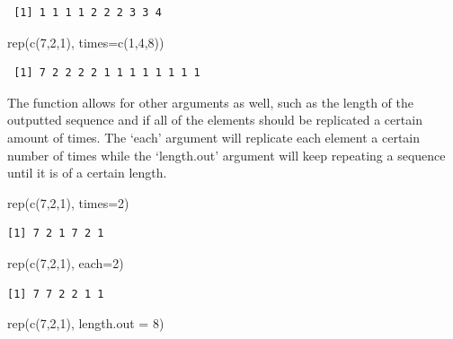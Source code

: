 \documentclass[
  letterpaper,
  DIV=11,
  numbers=noendperiod]{scrreprt}
\newenvironment{Shaded}{\begin{snugshade}}{\end{snugshade}}
\newcommand{\AttributeTok}[1]{\textcolor[rgb]{0.40,0.45,0.13}{#1}}
\newcommand{\DecValTok}[1]{\textcolor[rgb]{0.68,0.00,0.00}{#1}}
\newcommand{\FunctionTok}[1]{\textcolor[rgb]{0.28,0.35,0.67}{#1}}
\newcommand{\NormalTok}[1]{\textcolor[rgb]{0.00,0.23,0.31}{#1}}
\begin{document}
\begin{verbatim}
 [1] 1 1 1 1 2 2 2 3 3 4
\end{verbatim}

\begin{Shaded}
\begin{Highlighting}[]
\FunctionTok{rep}\NormalTok{(}\FunctionTok{c}\NormalTok{(}\DecValTok{7}\NormalTok{,}\DecValTok{2}\NormalTok{,}\DecValTok{1}\NormalTok{), }\AttributeTok{times=}\FunctionTok{c}\NormalTok{(}\DecValTok{1}\NormalTok{,}\DecValTok{4}\NormalTok{,}\DecValTok{8}\NormalTok{))}
\end{Highlighting}
\end{Shaded}

\begin{verbatim}
 [1] 7 2 2 2 2 1 1 1 1 1 1 1 1
\end{verbatim}

The function allows for other arguments as well, such as the length of
the outputted sequence and if all of the elements should be replicated a
certain amount of times. The `each' argument will replicate each element
a certain number of times while the `length.out' argument will keep
repeating a sequence until it is of a certain length.

\begin{Shaded}
\begin{Highlighting}[]
\FunctionTok{rep}\NormalTok{(}\FunctionTok{c}\NormalTok{(}\DecValTok{7}\NormalTok{,}\DecValTok{2}\NormalTok{,}\DecValTok{1}\NormalTok{), }\AttributeTok{times=}\DecValTok{2}\NormalTok{)}
\end{Highlighting}
\end{Shaded}

\begin{verbatim}
[1] 7 2 1 7 2 1
\end{verbatim}

\begin{Shaded}
\begin{Highlighting}[]
\FunctionTok{rep}\NormalTok{(}\FunctionTok{c}\NormalTok{(}\DecValTok{7}\NormalTok{,}\DecValTok{2}\NormalTok{,}\DecValTok{1}\NormalTok{), }\AttributeTok{each=}\DecValTok{2}\NormalTok{)}
\end{Highlighting}
\end{Shaded}

\begin{verbatim}
[1] 7 7 2 2 1 1
\end{verbatim}

\begin{Shaded}
\begin{Highlighting}[]
\FunctionTok{rep}\NormalTok{(}\FunctionTok{c}\NormalTok{(}\DecValTok{7}\NormalTok{,}\DecValTok{2}\NormalTok{,}\DecValTok{1}\NormalTok{), }\AttributeTok{length.out =} \DecValTok{8}\NormalTok{)}
\end{Highlighting}
\end{Shaded}
\end{document}
